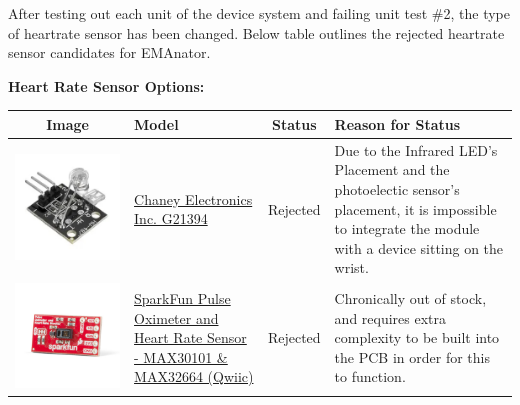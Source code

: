 \documentclass[12pt, titlepage]{article}
\begin{document}
After testing out each unit of the device system and failing unit test \#2, the type of heartrate sensor has been changed. Below table outlines the rejected heartrate sensor candidates for EMAnator.

\textbf{Heart Rate Sensor Options:}\\

\begin{table}[H]
\begin{tabular}{ | c | m{3cm} | c | m{7cm} |}
\hline
\textbf{Image} & \textbf{Model} & \textbf{Status} & \textbf{Reason for Status}\\
\hline
 \includegraphics[scale = 0.5]{G21394} & \href{https://secure.sayal.com/STORE2/View_SHOP.php?SKU=247799}{Chaney Electronics Inc. G21394}  & Rejected & Due to the Infrared LED's Placement and the photoelectic sensor's placement, it is impossible to integrate the module with a device sitting on the wrist.\\
\hline
 \includegraphics[scale = 0.5]{sparkfun} & \href{https://www.sparkfun.com/products/15219}{SparkFun Pulse Oximeter and Heart Rate Sensor - MAX30101 \& MAX32664 (Qwiic)}  & Rejected & Chronically out of stock, and requires extra complexity to be built into the PCB in order for this to function.\\

\end{tabular}
\end{table}
\end{document}
